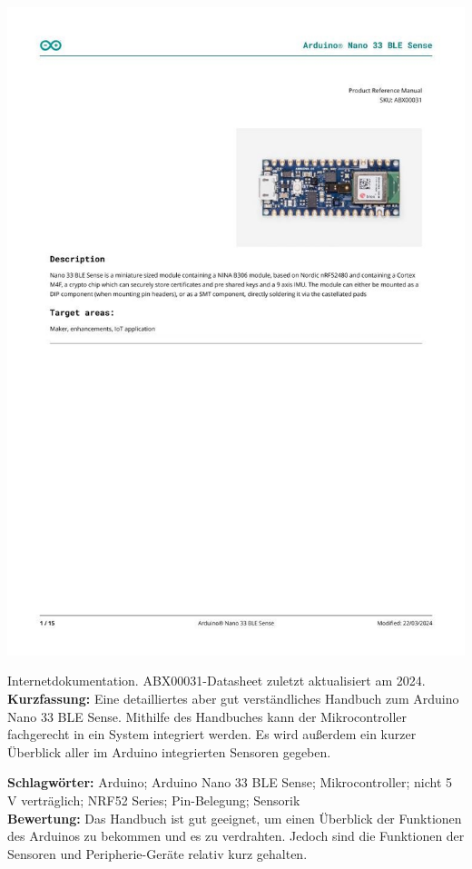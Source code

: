 {
\begin{minipage}{0.38\textwidth}
	\includegraphics[width=\linewidth]{images/Arduino.jpg}
\end{minipage}
\hfill
\begin{minipage}{0.6\textwidth}
Internetdokumentation. ABX00031-Datasheet
zuletzt aktualisiert am 2024.
\\ \textbf{Kurzfassung:}
Eine detailliertes aber gut verständliches Handbuch zum Arduino Nano 33 BLE Sense. Mithilfe des Handbuches kann der Mikrocontroller fachgerecht in ein System integriert werden. Es wird außerdem ein kurzer Überblick aller im Arduino integrierten Sensoren gegeben.	
\end{minipage}
\textbf{Schlagwörter:}
Arduino; Arduino Nano 33 BLE Sense; Mikrocontroller; nicht 5 V verträglich; NRF52 Series; Pin-Belegung; Sensorik
\\ \textbf{Bewertung:}
Das Handbuch ist gut geeignet, um einen Überblick der Funktionen des Arduinos zu bekommen und es zu verdrahten. Jedoch sind die Funktionen der Sensoren und Peripherie-Geräte relativ kurz gehalten.
}

